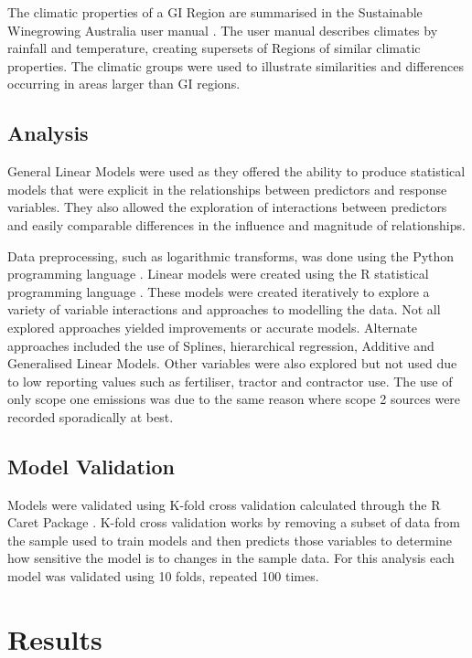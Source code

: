 \documentclass[review,12pt,authoryear]{elsarticle}
\begin{document}
\begin{linenumbers}
The climatic properties of a GI Region are summarised in the Sustainable Winegrowing Australia user manual \citep{swaSustainableWinegrowingAustralia2021}. The user manual describes climates by rainfall and temperature, creating supersets of Regions of similar climatic properties. The climatic groups were used to illustrate similarities and differences occurring in areas larger than GI regions.

\subsection{Analysis}
General Linear Models were used as they offered the ability to produce statistical models that were explicit in the relationships between predictors and response variables. They also allowed the exploration of interactions between predictors and easily comparable differences in the influence and magnitude of relationships.

Data preprocessing, such as logarithmic transforms, was done using the Python programming language \citep{g.vanrossumPythonTutorialTechnical1995}. Linear models were created using the R statistical programming language \citep{rcoreteamLanguageEnvironmentStatistical2021}. These models were created iteratively to explore a variety of variable interactions and approaches to modelling the data. Not all explored approaches yielded improvements or accurate models. Alternate approaches included the use of Splines, hierarchical regression, Additive and Generalised Linear Models. Other variables were also explored but not used due to low reporting values such as fertiliser, tractor and contractor use. The use of only scope one emissions was due to the same reason where scope 2 sources were recorded sporadically at best.

\subsection{Model Validation}
Models were validated using K-fold cross validation calculated through the R Caret Package \citep{kuhnBuildingPredictiveModels2008}. K-fold cross validation works by removing a subset of data from the sample used to train models and then predicts those variables to determine how sensitive the model is to changes in the sample data. For this analysis each model was validated using 10 folds, repeated 100 times. %

\section{Results}

\end{linenumbers}
\end{document}
